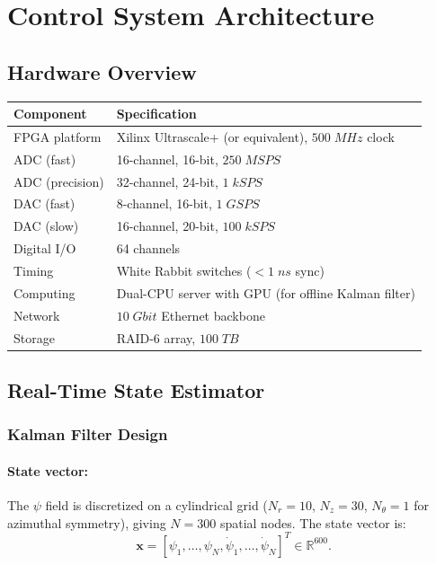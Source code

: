 \documentclass[11pt,a4paper]{article}
\begin{document}
\section{Control System Architecture}

\subsection{Hardware Overview}

\begin{longtable}{p{}p{}}
\toprule
\textbf{Component} & \textbf{Specification} \\
\midrule
\endhead
FPGA platform & Xilinx Ultrascale+ (or equivalent), $500\;\si{MHz}$
clock \\
ADC (fast) & 16-channel, 16-bit, $250\;\si{MSPS}$ \\
ADC (precision) & 32-channel, 24-bit, $1\;\si{kSPS}$ \\
DAC (fast) & 8-channel, 16-bit, $1\;\si{GSPS}$ \\
DAC (slow) & 16-channel, 20-bit, $100\;\si{kSPS}$ \\
Digital I/O & 64 channels \\
Timing & White Rabbit switches ($< 1\;\si{ns}$ sync) \\
Computing & Dual-CPU server with GPU (for offline Kalman filter) \\
Network & $10\;\si{Gbit}$ Ethernet backbone \\
Storage & RAID-6 array, $100\;\si{TB}$ \\
\bottomrule
\end{longtable}

\subsection{Real-Time State Estimator}

\subsubsection{Kalman Filter Design}

\paragraph{State vector:}
The $\psi$ field is discretized on a cylindrical grid
($N_r = 10$, $N_z = 30$, $N_\theta = 1$ for azimuthal symmetry),
giving $N = 300$ spatial nodes.  The state vector is:
\begin{equation}
\mathbf{x} = [\psi_1, \ldots, \psi_N,
\dot{\psi}_1, \ldots, \dot{\psi}_N]^T
\in \mathbb{R}^{600}.
\end{equation}
\end{document}

